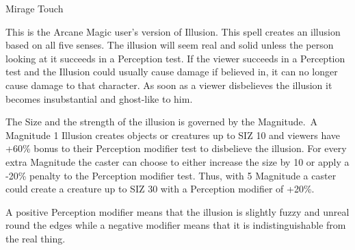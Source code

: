 \begin{rpg-spell}
{Mirage}
{Touch}

This is the Arcane Magic user’s version of Illusion. This spell creates an illusion based on all five senses. The illusion will seem real and solid unless the person looking at it succeeds in a Perception test. If the viewer succeeds in a Perception test and the Illusion could usually cause damage if believed in, it can no longer cause damage to that character. As soon as a viewer disbelieves the illusion it becomes insubstantial and ghost-like to him.

The Size and the strength of the illusion is governed by the Magnitude. A Magnitude 1 Illusion creates objects or creatures up to SIZ 10 and viewers have +60\% bonus to their Perception modifier test to disbelieve the illusion. For every extra Magnitude the caster can choose to either increase the size by 10 or apply a -20\% penalty to the Perception modifier test. Thus, with 5 Magnitude a caster could create a creature up to SIZ 30 with a Perception modifier of +20\%.
	
A positive Perception modifier means that the illusion is slightly fuzzy and unreal round the edges while a negative modifier means that it is indistinguishable from the real thing.
\end{rpg-spell}


